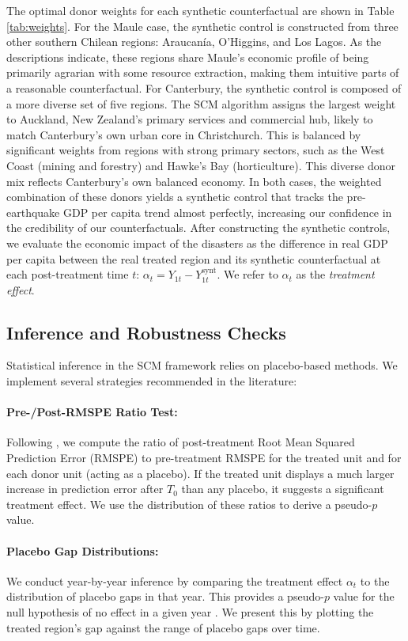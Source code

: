 \documentclass[12pt]{article}
\begin{document}
The optimal donor weights for each synthetic counterfactual are shown in Table \ref{tab:weights}. For the Maule case, the synthetic control is constructed from three other southern Chilean regions: Araucanía, O’Higgins, and Los Lagos. As the descriptions indicate, these regions share Maule's economic profile of being primarily agrarian with some resource extraction, making them intuitive parts of a reasonable counterfactual. For Canterbury, the synthetic control is composed of a more diverse set of five regions. The SCM algorithm assigns the largest weight to Auckland, New Zealand's primary services and commercial hub, likely to match Canterbury's own urban core in Christchurch. This is balanced by significant weights from regions with strong primary sectors, such as the West Coast (mining and forestry) and Hawke's Bay (horticulture). This diverse donor mix reflects Canterbury's own balanced economy. In both cases, the weighted combination of these donors yields a synthetic control that tracks the pre-earthquake GDP per capita trend almost perfectly, increasing our confidence in the credibility of our counterfactuals. After constructing the synthetic controls, we evaluate the economic impact of the disasters as the difference in real GDP per capita between the real treated region and its synthetic counterfactual at each post-treatment time $t$: $\alpha_t = Y_{1t} - Y_{1t}^{\text{synt}}$. We refer to $\alpha_t$ as the \textit{treatment effect}.

\subsection{Inference and Robustness Checks}
Statistical inference in the SCM framework relies on placebo-based methods. We implement several strategies recommended in the literature:

\paragraph{Pre-/Post-RMSPE Ratio Test:} Following \textcite{abadie2010synthetic}, we compute the ratio of post-treatment Root Mean Squared Prediction Error (RMSPE) to pre-treatment RMSPE for the treated unit and for each donor unit (acting as a placebo). If the treated unit displays a much larger increase in prediction error after $T_0$ than any placebo, it suggests a significant treatment effect. We use the distribution of these ratios to derive a pseudo-$p$ value.

\paragraph{Placebo Gap Distributions:} We conduct year-by-year inference by comparing the treatment effect $\alpha_t$ to the distribution of placebo gaps in that year. This provides a pseudo-$p$ value for the null hypothesis of no effect in a given year \autocite{firpo2018synthetic}. We present this by plotting the treated region’s gap against the range of placebo gaps over time.
\end{document}
